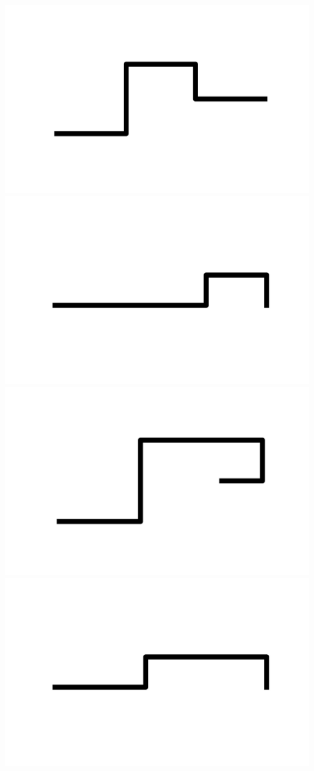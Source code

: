 \documentclass[]{report}
\begin{document}
\includegraphics[scale=.1]{pictures/17/state_cluster_shapes_3.pdf} 
\includegraphics[scale=.1]{pictures/17/state_cluster_shapes_4.pdf} 
\includegraphics[scale=.1]{pictures/17/state_cluster_shapes_5.pdf} 
\includegraphics[scale=.1]{pictures/17/state_cluster_shapes_6.pdf} 
\end{document}
